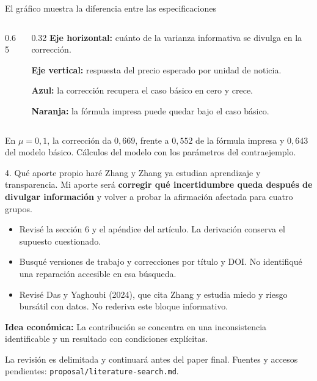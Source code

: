 \documentclass[aspectratio=169,11pt]{beamer}
\newcommand{\idea}[1]{\par\medskip\textbf{Idea económica:} #1}
\begin{document}
\begin{frame}{El gráfico muestra la diferencia entre las especificaciones}
 \begin{columns}[T,onlytextwidth]
  \begin{column}{0.65\textwidth}
   
  \end{column}
  \begin{column}{0.32\textwidth}
   \small
   \textbf{Eje horizontal:} cuánto de la varianza informativa se divulga
   en la corrección.
   \medskip\par
   \textbf{Eje vertical:} respuesta del precio esperado por unidad de noticia.
   \medskip\par
   \textbf{Azul:} la corrección recupera el caso básico en cero y crece.
   \medskip\par
   \textbf{Naranja:} la fórmula impresa puede quedar bajo el caso básico.
  \end{column}
 \end{columns}
 \small\medskip
 En \(\mu=0{,}1\), la corrección da \(0{,}669\), frente a \(0{,}552\)
 de la fórmula impresa y \(0{,}643\) del modelo básico.
 Cálculos del modelo con los parámetros del contraejemplo.
\end{frame}
\begin{frame}{4. Qué aporte propio haré}
 Zhang y Zhang ya estudian aprendizaje y transparencia.
 Mi aporte será \textbf{corregir qué incertidumbre queda después de divulgar información}
 y volver a probar la afirmación afectada para cuatro grupos.
 \medskip
 \begin{itemize}
  \item Revisé la sección 6 y el apéndice del artículo.
        La derivación conserva el supuesto cuestionado.
  \item Busqué versiones de trabajo y correcciones por título y DOI.
        No identifiqué una reparación accesible en esa búsqueda.
  \item Revisé Das y Yaghoubi (2024), que cita Zhang y estudia miedo
        y riesgo bursátil con datos. No rederiva este bloque informativo.
 \end{itemize}
 \idea{La contribución se concentra en una inconsistencia identificable y un resultado con condiciones explícitas.}
 \small\par\medskip
 La revisión es delimitada y continuará antes del paper final.
 Fuentes y accesos pendientes: \texttt{proposal/literature-search.md}.
\end{frame}
\end{document}
